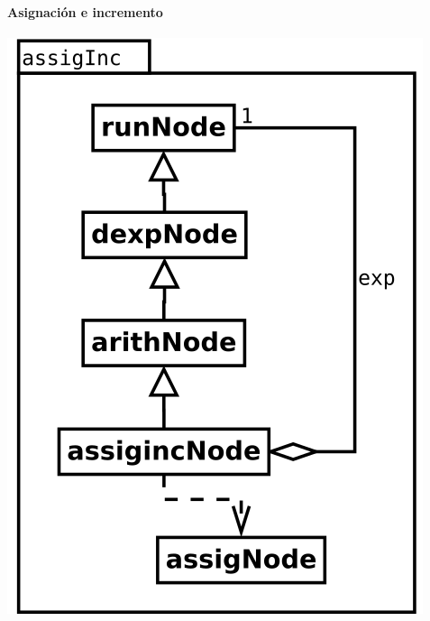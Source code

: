 \paragraph {Asignación e incremento}
\begin{center}
\includegraphics[scale=0.4]{assigInc.png} \\
\end{center}

